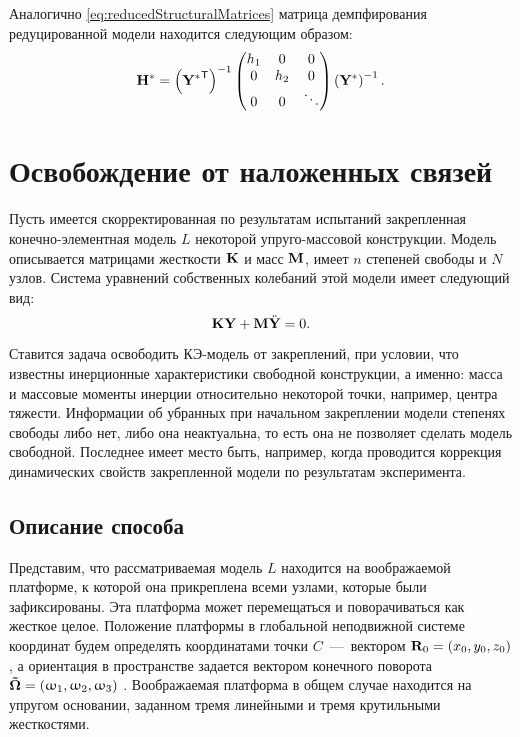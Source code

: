 Аналогично \eqref{eq:reducedStructuralMatrices} матрица демпфирования редуцированной модели находится следующим образом:
\begin{equation}
	\mathbf{H} ^ \ast = 
	\left( \mathbf{Y ^ \ast} ^ \mathsf{T} \right) ^ {-1} 
	\begin{pmatrix}
		h_1 & 0 & 0 \\
		0 & h_2 & 0 \\
		0 & 0 & \ddots
	\end{pmatrix} 
	\left( \mathbf{Y} ^ \ast \right) ^ {-1}.
	\label{eq:reducedDampingMatrix}
\end{equation}

\section{Освобождение от наложенных связей} \label{struct:freeing}

Пусть имеется скорректированная по результатам испытаний закрепленная конечно-элементная модель $ L $ некоторой упруго-массовой конструкции. Модель описывается матрицами жесткости $ \mathbf{K} $  и масс $ \mathbf{M} $, имеет $ n $  степеней свободы и $ N $ узлов. Система уравнений собственных колебаний этой модели имеет следующий вид:
\begin{equation}
	\mathbf{K} \mathbf{Y} + \mathbf{M} \ddot{\mathbf{Y}} = 0.
	\label{eq:eigFreeProblem}
\end{equation}

Ставится задача освободить КЭ-модель от закреплений, при условии, что известны инерционные характеристики свободной конструкции, а именно: масса и массовые моменты инерции относительно некоторой точки, например, центра тяжести. Информации об убранных при начальном закреплении модели степенях свободы либо нет, либо она неактуальна, то есть она не позволяет сделать модель свободной. Последнее имеет место быть, например, когда проводится коррекция динамических свойств закрепленной модели по результатам эксперимента.

\subsection{Описание способа}

Представим, что рассматриваемая модель $ L $ находится на воображаемой платформе, к которой она прикреплена всеми узлами, которые были зафиксированы. Эта платформа может перемещаться и поворачиваться как жесткое целое. Положение платформы в глобальной неподвижной системе координат будем определять координатами точки $ C $~---~вектором $ \mathbf{R}_0 = (x_0, y_0, z_0) $, а ориентация в пространстве задается вектором конечного поворота $ \mathbf{\vec{\mathbf{\Omega}}} = (\upomega_1, \upomega_2, \upomega_3) $ . Воображаемая платформа в общем случае находится на упругом основании, заданном тремя линейными и тремя крутильными жесткостями.

